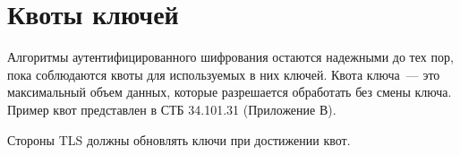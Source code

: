 \section{Квоты ключей}\label{RECORD.Limits}

Алгоритмы аутентифицированного шифрования остаются надежными до тех пор, пока 
соблюдаются квоты для используемых в них ключей. Квота ключа~--- это 
максимальный объем данных, которые разрешается обработать без смены ключа.
Пример квот представлен в СТБ 34.101.31 (Приложение В).

Стороны TLS должны обновлять ключи при достижении квот.

